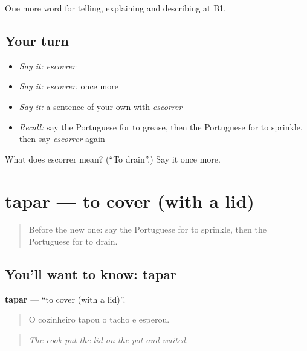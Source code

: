 \begin{grammarlens}[title={What you've built}]
One more word for telling, explaining and describing at B1.
\end{grammarlens}

\subsection*{Your turn}
\begin{itemize}
\raggedright
  \item \emph{Say it:} \emph{escorrer}
  \item \emph{Say it:} \emph{escorrer}, once more
  \item \emph{Say it:} a sentence of your own with \emph{escorrer}
  \item \emph{Recall:} say the Portuguese for to grease, then the Portuguese for to sprinkle, then say \emph{escorrer} again
\end{itemize}

\begin{tcolorbox}[breakable,colback=teal!4,colframe=teal!35!black,title={Before you move on}]
What does escorrer mean? (\textquotedblleft{}To drain\textquotedblright{}.) Say it once more.
\end{tcolorbox}
\section[tapar]{tapar — to cover (with a lid)}

\label{lesson:PT-C334-tapar}



\begin{quote}
Before the new one: say the Portuguese for to sprinkle, then the Portuguese for to drain.
\end{quote}

\subsection*{You'll want to know: tapar}
\textbf{tapar} — \textquotedblleft{}to cover (with a lid)\textquotedblright{}.

\begin{quote}
O cozinheiro tapou o tacho e esperou.
\end{quote}

\begin{quote}
\emph{The cook put the lid on the pot and waited.}
\end{quote}

